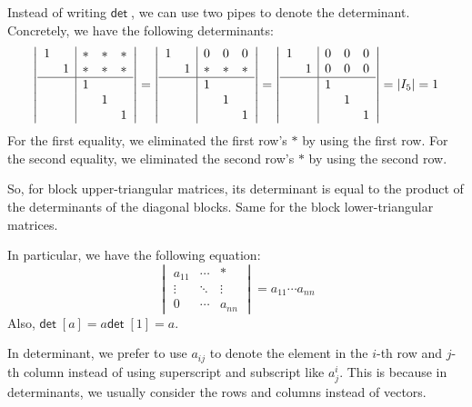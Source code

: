 \documentclass[
	11pt, %
	fleqn, %
	a4paper, %
]{LegrandOrangeBook}
\renewcommand{\det}{\mathsf{det\;}} %
\begin{document}
Instead of writing $\det$, we can use two pipes to denote the determinant. Concretely, we have the following determinants:
\[
    \left|
        \begin{array}{cc|ccc}
            1 & & * & * & * \\
            & 1 & * & * & * \\
            \hline
            & & 1 & & \\
            & & & 1 & \\
            & & & & 1
        \end{array}
    \right| = \left|
        \begin{array}{cc|ccc}
            1 & & 0 & 0 & 0 \\
            & 1 & * & * & * \\
            \hline
            & & 1 & & \\
            & & & 1 & \\
            & & & & 1
        \end{array}
    \right| = \left|
        \begin{array}{cc|ccc}
            1 & & 0 & 0 & 0 \\
            & 1 & 0 & 0 & 0 \\
            \hline
            & & 1 & & \\
            & & & 1 & \\
            & & & & 1
        \end{array}
    \right| = |I_5| = 1
\]
For the first equality, we eliminated the first row's $*$ by using the first row. For the second equality, we eliminated the second row's $*$ by using the second row.

So, for block upper-triangular matrices, its determinant is equal to the product of the determinants of the diagonal blocks. Same for the block lower-triangular matrices.

In particular, we have the following equation:
\[
    \begin{vmatrix}
        a_{11} & \cdots & * \\
        \vdots & \ddots & \vdots \\
        0 & \cdots & a_{nn}
    \end{vmatrix} = a_{11} \cdots a_{nn}
\]
Also, $\det [a] = a \det[1] = a$.
\begin{remark}
    In determinant, we prefer to use $a_{ij}$ to denote the element in the $i$-th row and $j$-th column instead of using superscript and subscript like $a_j^{i}$. This is because in determinants, we usually consider the rows and columns instead of vectors.
\end{remark}
\end{document}
